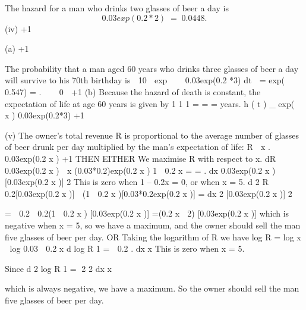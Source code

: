 \documentclass[a4paper,12pt]{article}
\begin{document}
The hazard for a man who drinks two glasses of beer a day is
\[0.03exp(0.2 * 2) \;=\; 0.0448.\]
(iv)
+1

(a)
+1

The probability that a man aged 60 years who drinks three glasses of
beer a day will survive to his 70th birthday is
 10

exp    0.03exp(0.2 *3) dt  \;=\; exp(  0.547) \;= .


 0

+1
(b)
Because the hazard of death is constant, the expectation of life at age
60 years is given by
1
1
1
\;=\;
\;=\;
\;= years.
h ( t ) \mu_ exp(  x ) 0.03exp(0.2*3)
+1

(v)
The owner’s total revenue R is proportional to the average number of glasses
of beer drunk per day multiplied by the man's expectation of life:
R 
x
.
0.03exp(0.2 x )
+1
THEN EITHER
We maximise R with respect to x.
dR 0.03exp(0.2 x )  x (0.03*0.2)exp(0.2 x )
1  0.2 x
\;=\;
\;=\;
.
dx
0.03exp(0.2 x )
[0.03exp(0.2 x )] 2
This is zero when 1 – 0.2x = 0, or when x = 5.
d 2 R  0.2[0.03exp(0.2 x )]  (1  0.2 x )[0.03*0.2exp(0.2 x )]
\;=\;
dx 2
[0.03exp(0.2 x )] 2



\;=\;
 0.2  0.2(1  0.2 x )
[0.03exp(0.2 x )]
\;=(0.2 x  2)
[0.03exp(0.2 x )]
which is negative when x = 5, 
so we have a maximum, 
and the owner should sell the man five glasses of beer per day. 
OR
Taking the logarithm of R we have
log R \;=\; log x  log 0.03  0.2 x
d log R 1
\;=\;  0.2 .
dx
x
This is zero when x = 5.


Since
d 2 log R
1
\;=\; 2
2
dx
x

which is always negative, 
we have a maximum. 
So the owner should sell the man five glasses of beer per day.


\end{document}
